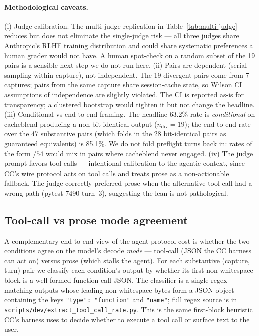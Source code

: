 \paragraph{Methodological caveats.}
(i) Judge calibration. The multi-judge replication in
Table~\ref{tab:multi-judge} reduces but does not eliminate the
single-judge risk --- all three judges share Anthropic's RLHF
training distribution and could share systematic preferences a
human grader would not have. A human spot-check on a random subset
of the 19 pairs is a sensible next step we do not run here.
(ii) Pairs are dependent (serial sampling within capture), not
independent. The 19 divergent pairs come from 7 captures; pairs from
the same capture share session-cache state, so Wilson CI assumptions
of independence are slightly violated. The CI is reported as-is for
transparency; a clustered bootstrap would tighten it but not change
the headline.
(iii) Conditional vs end-to-end framing. The headline 63.2\% rate is
\emph{conditional} on cacheblend producing a non-bit-identical output
($n_{\text{div}}{=}19$); the end-to-end rate over the 47 substantive
pairs (which folds in the 28 bit-identical pairs as guaranteed
equivalents) is 85.1\%. We do not fold preflight turns back in: rates
of the form $/54$ would mix in pairs where cacheblend never engaged.
(iv) The judge prompt favors tool calls --- intentional calibration to
the agentic context, since CC's wire protocol acts on tool calls and
treats prose as a non-actionable fallback. The judge correctly
preferred prose when the alternative tool call had a wrong
path (pytest-7490 turn~3), suggesting the lean is not pathological.

\subsection{Tool-call vs prose mode agreement}
\label{sec:eval-mode}

A complementary end-to-end view of the agent-protocol cost is whether
the two conditions agree on the model's decode \emph{mode} ---
tool-call (JSON the CC harness can act on) versus prose (which stalls
the agent). For each substantive (capture, turn) pair we classify each
condition's output by whether its first non-whitespace block is a
well-formed function-call JSON. The classifier is a single regex
matching outputs whose leading non-whitespace bytes form a JSON
object containing the keys \texttt{"type": "function"} and
\texttt{"name"}; full regex source is in
\texttt{scripts/dev/extract\_\allowbreak{}tool\_\allowbreak{}call\_\allowbreak{}rate.py}.
This is the same first-block heuristic CC's harness uses to decide
whether to execute a tool call or surface text to the user.

